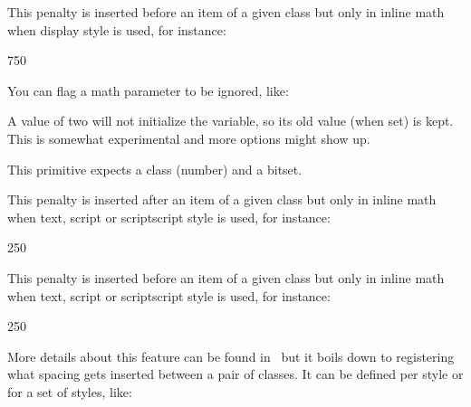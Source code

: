 This penalty is inserted before an item of a given class but only in inline math
when display style is used, for instance:

\starttyping
{} 750
\stoptyping

\stopnewprimitive

\startnewprimitive[title={\prm {setmathignore}}]

You can flag a math parameter to be ignored, like:

\starttyping
\setmathignore {}
\setmathignore {}
\setmathignore {}
\setmathignore {}
\setmathignore {}
\stoptyping

A value of two will not initialize the variable, so its old value (when set) is
kept. This is somewhat experimental and more options might show up.

\stopnewprimitive

\startnewprimitive[title={\prm {setmathoptions}}]

This primitive expects a class (number) and a bitset.

\testpage[2]

\starttworows
{}%
\stoptworows

\stopnewprimitive

\startnewprimitive[title={\prm {setmathpostpenalty}}]

This penalty is inserted after an item of a given class but only in inline math
when text, script or scriptscript style is used, for instance:

\starttyping
{} 250
\stoptyping

\stopnewprimitive

\startnewprimitive[title={\prm {setmathprepenalty}}]

This penalty is inserted before an item of a given class but only in inline math
when text, script or scriptscript style is used, for instance:

\starttyping
{} 250
\stoptyping

\stopnewprimitive

\startnewprimitive[title={\prm {setmathspacing}}]

More details about this feature can be found in \CONTEXT\ but it boils down to
registering what spacing gets inserted between a pair of classes. It can be
defined per style or for a set of styles, like:

